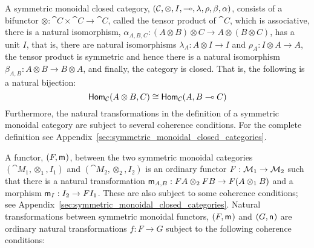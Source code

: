 A symmetric monoidal closed category, $(\mathcal{C}, \otimes, I, \multimap,
\lambda, \rho, \beta, \alpha)$, consists of a bifunctor $\otimes :
\cat{C} \times \cat{C} \to \cat{C}$, called the tensor product of
$\cat{C}$, which is associative, there is a natural isomorphism,
$\alpha_{A,B,C} : (A \otimes B) \otimes C \to A \otimes (B \otimes
C)$, has a unit $I$, that is, there are natural isomorphisms
$\lambda_A : A \otimes I \to I$ and $\rho_A : I \otimes A \to A$, the
tensor product is symmetric and hence there is a natural isomorphism
$\beta_{A,B} : A \otimes B \to B \otimes A$, and finally, the category
is closed.  That is, the following is a natural bijection:
\[
\mathsf{Hom}_{\mathcal{C}}(A \otimes B,C) \cong \mathsf{Hom}_{\mathcal{C}}(A, B \multimap C)
\]
Furthermore, the natural transformations in the definition of a
symmetric monoidal category are subject to several coherence
conditions.  For the complete definition see
Appendix~\ref{sec:symmetric_monoidal_closed_categories}.

A functor, $(F,\mathsf{m}_{})$, between the two symmetric monoidal categories
$(\cat{M}_1, \otimes_1, I_1)$ and $(\cat{M}_2, \otimes_2, I_2)$ is an
ordinary functor $F : \cat{M}_1 \mto \cat{M}_2$ such that there is a
natural transformation $\m{A,B} : FA \otimes_2 FB \mto F(A \otimes_1
B)$ and a morphism $\m{I} : I_2 \mto FI_1$.  These are also subject to
some coherence conditions; see
Appendix~\ref{sec:symmetric_monoidal_closed_categories}.  Natural
transformations between symmetric monoidal functors, $(F, \mathsf{m}_{})$ and
$(G, \mathsf{n}_{})$ are ordinary natural transformations $f : F \to G$ subject
to the following coherence conditions:

